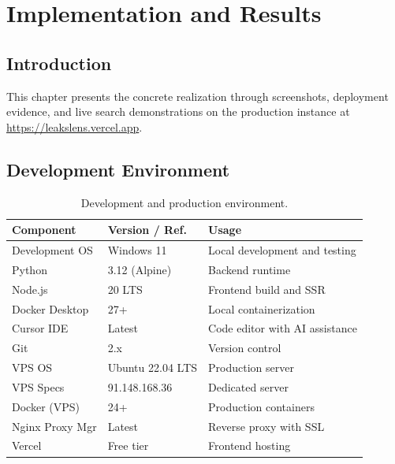 \chapter{Implementation and Results}
\label{chap:implementation}

\section*{Introduction}

This chapter presents the concrete realization through screenshots, deployment
evidence, and live search demonstrations on the production instance at
\url{https://leakslens.vercel.app}.

\section{Development Environment}
\label{sec:devenv}

\begin{table}[H]
\centering
\caption{Development and production environment.}
\label{tab:devenv}
\small
\begin{tabularx}{\textwidth}{@{} l l X @{}}
\toprule
\textbf{Component} & \textbf{Version / Ref.} & \textbf{Usage} \\
\midrule
Development OS    & Windows 11              & Local development and testing \\
Python            & 3.12 (Alpine)           & Backend runtime \\
Node.js           & 20 LTS                  & Frontend build and SSR \\
Docker Desktop    & 27+                     & Local containerization \\
Cursor IDE        & Latest                  & Code editor with AI assistance \\
Git               & 2.x                     & Version control \\
VPS OS            & Ubuntu 22.04 LTS        & Production server \\
VPS Specs         & 91.148.168.36           & Dedicated server \\
Docker (VPS)      & 24+                     & Production containers \\
Nginx Proxy Mgr   & Latest                  & Reverse proxy with SSL \\
Vercel            & Free tier               & Frontend hosting \\
\bottomrule
\end{tabularx}
\end{table}

